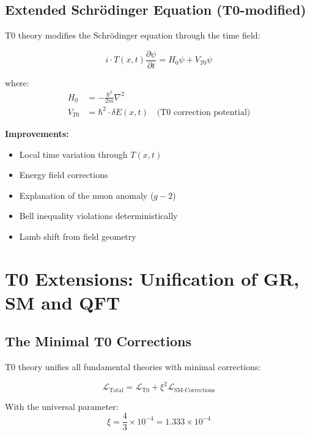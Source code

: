 	\subsection{Extended Schrödinger Equation (T0-modified)}
	
	T0 theory modifies the Schrödinger equation through the time field:
	
	\begin{t0box}
		\begin{equation}
			i \cdot T(x,t) \frac{\partial\psi}{\partial t} = H_0 \psi + V_{T0} \psi
		\end{equation}
		
		where:
		\begin{align}
			H_0 &= -\frac{\hbar^2}{2m} \nabla^2 \\
			V_{T0} &= \hbar^2 \cdot \delta E(x,t) \quad \text{(T0 correction potential)}
		\end{align}
	\end{t0box}
	
	\textbf{Improvements:}
	\begin{itemize}
		\item Local time variation through $T(x,t)$
		\item Energy field corrections
		\item Explanation of the muon anomaly ($g-2$)
		\item Bell inequality violations deterministically
		\item Lamb shift from field geometry
	\end{itemize}
	
	\section{T0 Extensions: Unification of GR, SM and QFT}
	
	\subsection{The Minimal T0 Corrections}
	
	T0 theory unifies all fundamental theories with minimal corrections:
	
	\begin{t0box}[T0 Unification]
		\begin{equation}
			\mathcal{L}_{\text{Total}} = \mathcal{L}_{\text{T0}} + \xi^2 \mathcal{L}_{\text{SM-Corrections}}
		\end{equation}
		
		With the universal parameter:
		\begin{equation}
			\xi = \frac{4}{3} \times 10^{-4} = 1.333 \times 10^{-4}
		\end{equation}
	\end{t0box}
	
